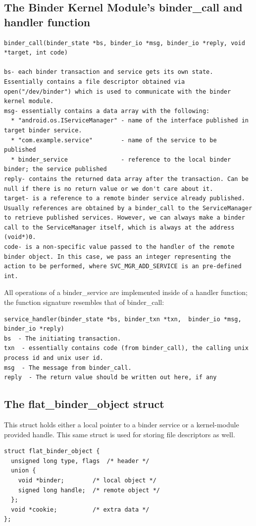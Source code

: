 \documentclass[prodmode]{acmlarge}
\begin{document}
\subsection{The Binder Kernel Module's binder\_call and handler function}
\begin{Verbatim}[samepage=true]
binder_call(binder_state *bs, binder_io *msg, binder_io *reply, void *target, int code)

bs- each binder transaction and service gets its own state. Essentially contains a file descriptor obtained via open("/dev/binder") which is used to communicate with the binder kernel module.
msg- essentially contains a data array with the following:
  * "android.os.IServiceManager" - name of the interface published in target binder service.
  * "com.example.service"        - name of the service to be  published
  * binder_service               - reference to the local binder binder; the service published
reply- contains the returned data array after the transaction. Can be null if there is no return value or we don't care about it.
target- is a reference to a remote binder service already published. Usually references are obtained by a binder_call to the ServiceManager to retrieve published services. However, we can always make a binder call to the ServiceManager itself, which is always at the address (void*)0.
code- is a non-specific value passed to the handler of the remote binder object. In this case, we pass an integer representing the action to be performed, where SVC_MGR_ADD_SERVICE is an pre-defined int.
\end{Verbatim}

All operations of a binder\_service are implemented inside of a handler function; the function signature resembles that of binder\_call:
\begin{Verbatim}[samepage=true]
service_handler(binder_state *bs, binder_txn *txn,  binder_io *msg,  binder_io *reply)
bs  - The initiating transaction.
txn  - essentially contains code (from binder_call), the calling unix process id and unix user id.
msg  - The message from binder_call.
reply  - The return value should be written out here, if any
\end{Verbatim}

\subsection{The flat\_binder\_object struct}
This struct holds either a local pointer to a binder service or a kernel-module provided handle. This same struct is used for storing file descriptors as well.
\begin{Verbatim}[samepage=true]
struct flat_binder_object {
  unsigned long type, flags  /* header */
  union {
    void *binder;        /* local object */
    signed long handle;  /* remote object */
  };
  void *cookie;          /* extra data */
};
\end{Verbatim}
\end{document}
